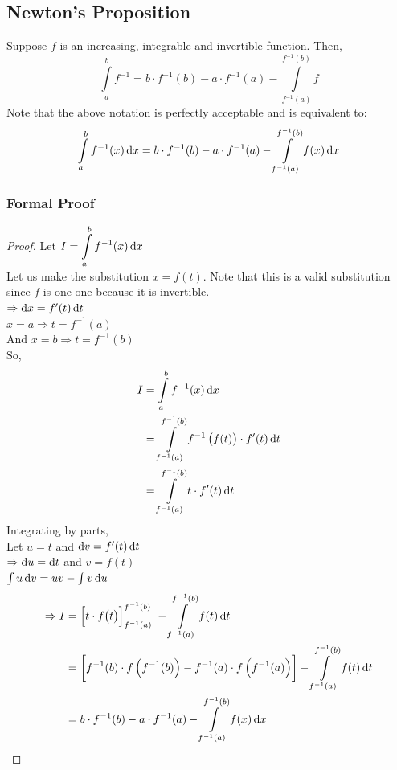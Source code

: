\documentclass[14]{article}
\theoremstyle{definition}
\theoremstyle{case}
\begin{document}
\subsection{Newton's Proposition}
Suppose $f$ is an increasing, integrable and invertible function. Then,
\[\int \limits_a^b f^{-1} = b \cdot f^{-1}(b) - a \cdot f^{-1}(a) - \int\limits_{f^{-1}(a)}^{f^{-1}(b)} f\]
Note that the above notation is perfectly acceptable and is equivalent to:
\[\int \limits_a^b f^{-1}(x) \dif x = b \cdot f^{-1}(b) - a \cdot f^{-1}(a) - \int\limits_{f^{-1}(a)}^{f^{-1}(b)} f(x) \dif x\]
\subsubsection{Formal Proof}
\begin{proof}
Let $I = \displaystyle\int\limits_a^b f^{-1}(x) \dif x$\\
Let us make the substitution $x = f(t)$. Note that this is a valid substitution since $f$ is one-one because it is invertible.\\
$\Rightarrow \dif x = f'(t) \dif t$\\
$x = a \Rightarrow t = f^{-1}(a)$\\
And $x = b \Rightarrow t = f^{-1}(b)$\\
So, 
\begin{align*}
I &= \int\limits_a^b f^{-1}(x) \dif x\\
&= \int\limits_{f^{-1}(a)}^{f^{-1}(b)} f^{-1}\left(f(t) \right) \cdot f'(t) \dif t\\
&= \int\limits_{f^{-1}(a)}^{f^{-1}(b)} t \cdot f'(t) \dif t
\end{align*}
Integrating by parts,\\
Let $u = t$ and $\dif v = f'(t) \dif t$\\
$\Rightarrow \dif u = \dif t$ and $v = f(t)$\\
$\int u \dif v = uv - \int v \dif u$
\begin{align*}
\Rightarrow I &= \left[ t \cdot f\big( t \big) \right]_{f^{-1}(a)}^{f^{-1}(b)} \; - \int\limits_{f^{-1}(a)}^{f^{-1}(b)} f(t) \dif t\\
&= \left[ f^{-1}(b) \cdot f\left( f^{-1}(b) \right) - f^{-1}(a) \cdot f\left( f^{-1}(a) \right)\right] - \int\limits_{f^{-1}(a)}^{f^{-1}(b)} f(t) \dif t\\
&= b \cdot f^{-1}(b) - a \cdot f^{-1}(a) - \int\limits_{f^{-1}(a)}^{f^{-1}(b)} f(x) \dif x\\
\end{align*}
\end{proof}
\pagebreak
\end{document}
